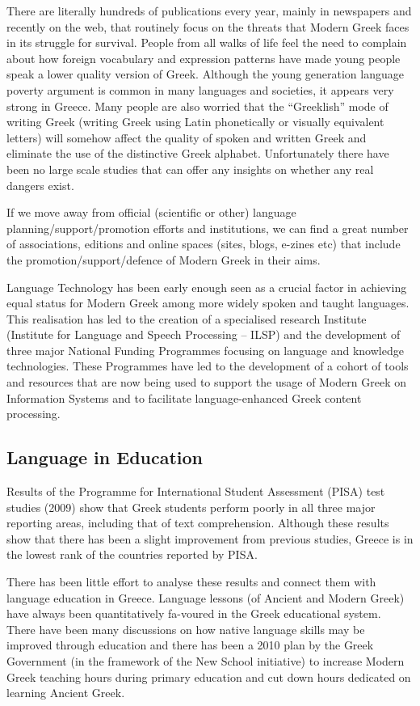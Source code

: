 \documentclass[]{../../metanetpaper}
\begin{document}
\begin{multicols}{2}
There are literally hundreds of publications every year, mainly in newspapers and recently on the web, that routinely focus on the threats that Modern Greek faces in its struggle for survival. People from all walks of life feel the need to complain about how foreign vocabulary and expression patterns have made young people speak a lower quality version of Greek. Although the young generation language poverty argument is common in many languages and societies, it appears very strong in Greece. Many people are also worried that the “Greeklish” mode of writing Greek (writing Greek using Latin phonetically or visually equivalent letters) will somehow affect the quality of spoken and written Greek and eliminate the use of the distinctive Greek alphabet. Unfortunately there have been no large scale studies that can offer any insights on whether any real dangers exist.

If we move away from official (scientific or other) language planning/support/promotion efforts and institutions, we can find a great number of associations, editions and online spaces (sites, blogs, e-zines etc) that include the promotion/support/defence of Modern Greek in their aims.

Language Technology has been early enough seen as a crucial factor in achieving equal status for Modern Greek among more widely spoken and taught languages. This realisation has led to the creation of a specialised research Institute (Institute for Language and Speech Processing – ILSP) and the development of three major National Funding Programmes focusing on language and knowledge technologies. These Programmes have led to the development of a cohort of tools and resources that are now being used to support the usage of Modern Greek on Information Systems and to facilitate language-enhanced Greek content processing.

\subsection{Language in Education}

Results of the Programme for International Student Assessment (PISA) test studies (2009) \cite{Pisa2} show that Greek students perform poorly in all three major reporting areas, including that of text comprehension. Although these results show that there has been a slight improvement from previous studies, Greece is in the lowest rank of the countries reported by PISA.

There has been little effort to analyse these results and connect them with language education in Greece. Language lessons (of Ancient and Modern Greek) have always been quantitatively fa-voured in the Greek educational system. There have been many discussions on how native language skills may be improved through education and there has been a 2010 plan by the Greek Government (in the framework of the New School initiative) to increase Modern Greek teaching hours during primary education and cut down hours dedicated on learning Ancient Greek.


\end{multicols}
\end{document}
